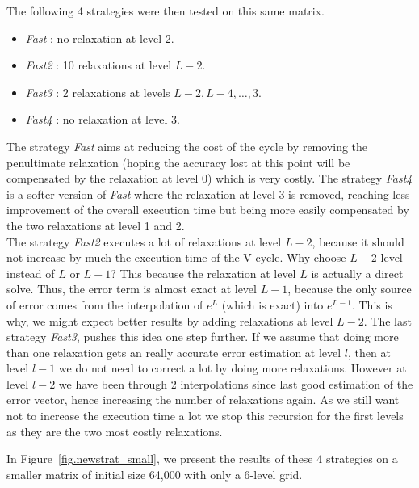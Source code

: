 \documentclass[sigplan]{acmart}
\begin{document}
 The following 4 strategies were then tested on this same matrix.
  \begin{itemize}
   \item \emph{Fast} : no relaxation at level 2.
   \item \emph{Fast2} : 10 relaxations at level $L-2$.
   \item \emph{Fast3} : 2 relaxations at levels $L-2,L-4,\dots,3$.
   \item \emph{Fast4} : no relaxation at level 3.
  \end{itemize}
  The strategy \emph{Fast} aims at reducing the cost of the cycle by removing the penultimate relaxation (hoping the accuracy lost at this point will be compensated by the relaxation at level 0) which is very costly.
  The strategy \emph{Fast4} is a softer version of \emph{Fast} where the relaxation at level 3 is removed, reaching less improvement of the overall execution time but being more easily compensated by the two relaxations at level 1 and 2.\\
  The strategy \emph{Fast2} executes a lot of relaxations at level $L-2$, because it should not increase by much the execution time of the V-cycle. Why choose $L-2$ level instead of $L$ or $L-1$?
  This because the relaxation at level $L$ is actually a direct solve. Thus, the error term is almost exact at level $L-1$, because the only source of error
  comes from the interpolation of $e^L$ (which is exact) into $e^{L-1}$. This is why, we might expect better results by adding relaxations at level $L-2$.
  The last strategy \emph{Fast3}, pushes this idea one step further. If we assume that doing more than one relaxation gets an really accurate error estimation at level $l$, then
  at level $l-1$ we do not need to correct a lot by doing more relaxations. However at level $l-2$ we have been through 2 interpolations since last good estimation of the error vector, hence increasing the number of relaxations again.
  As we still want not to increase the execution time a lot we stop this recursion for the first levels as they are the two most costly relaxations.
  
  In Figure~\ref{fig.newstrat_small}, we present the results of these 4 strategies on a smaller matrix of initial size 64,000 with only a 6-level grid.
  
\end{document}
